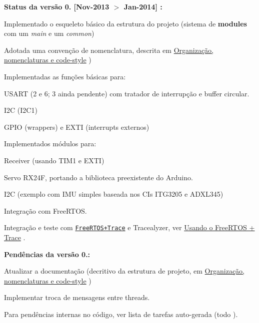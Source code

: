 {\bfseries Status da versão 0. \mbox{[}Nov-\/2013 $>$ Jan-\/2014\mbox{]} \-:}
\begin{DoxyItemize}
\item Implementado o esqueleto básico da estrutura do projeto (sistema de {\bfseries modules} com um {\itshape main} e um {\itshape common})
\item Adotada uma convenção de nomenclatura, descrita em \hyperlink{page_naming}{Organização, nomenclaturas e code-\/style} )
\item Implementadas as funções básicas para\-:
\begin{DoxyItemize}
\item U\-S\-A\-R\-T (2 e 6; 3 ainda pendente) com tratador de interrupção e buffer circular.
\item I2\-C (I2\-C1)
\item G\-P\-I\-O (wrappers) e E\-X\-T\-I (interrupts externos)
\end{DoxyItemize}
\item Implementados módulos para\-:
\begin{DoxyItemize}
\item Receiver (usando T\-I\-M1 e E\-X\-T\-I)
\item Servo R\-X24\-F, portando a biblioteca preexistente do Arduino.
\item I2\-C (exemplo com I\-M\-U simples baseada nos C\-Is I\-T\-G3205 e A\-D\-X\-L345)
\end{DoxyItemize}
\item Integração com Free\-R\-T\-O\-S.
\item Integração e teste com \href{http://www.freertos.org/FreeRTOS-Plus/FreeRTOS_Plus_Trace/FreeRTOS_Plus_Trace.shtml}{\tt Free\-R\-T\-O\-S+\-Trace} e Tracealyzer, ver \hyperlink{page_freertosplustrace}{Usando o Free\-R\-T\-O\-S + Trace} .
\end{DoxyItemize}

{\bfseries Pendências da versão 0.\-:}
\begin{DoxyItemize}
\item Atualizar a documentação (decritivo da estrutura de projeto, em \hyperlink{page_naming}{Organização, nomenclaturas e code-\/style} )
\item Implementar troca de mensagens entre threads.
\end{DoxyItemize}

Para pendências internas no código, ver lista de tarefas auto-\/gerada (todo ). 